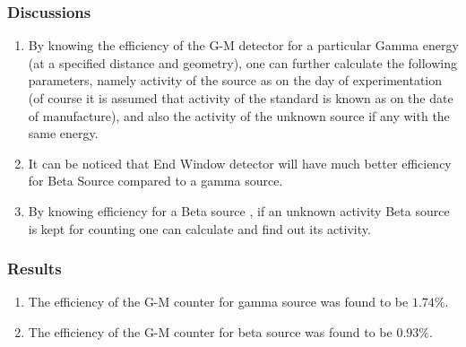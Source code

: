 \documentclass[%
 reprint,
nofootinbib,
 amsmath,amssymb,
 aps,
floatfix,
]{revtex4-2}
\begin{document}
        \subsubsection{Discussions}
        \begin{enumerate}
            \item By knowing the efficiency of the G-M detector for a particular Gamma energy (at a specified distance and geometry), one can further calculate the following parameters, namely activity of the source as on the day of experimentation (of course it is assumed that activity of the standard is known as on the date of manufacture), and also the activity of the unknown source if any with the same energy.
            \item It can be noticed that End Window detector will have much better efficiency for Beta Source compared to a gamma source.
            \item By knowing efficiency for a Beta source , if an unknown activity Beta source is kept for counting one can calculate and find out its activity.
        \end{enumerate}
        \subsubsection{Results}
        \begin{enumerate}
            \item The efficiency of the G-M counter for gamma source was found to be $1.74\%$.
            \item The efficiency of the G-M counter for beta source was found to be $0.93\%$.
        \end{enumerate}
\end{document}
